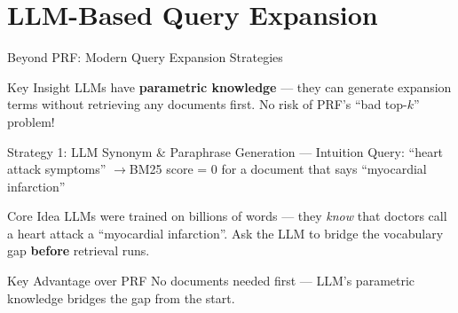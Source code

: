 \documentclass[aspectratio=169]{beamer}
\newif\ifanimated
\newcommand{\cpause}{\ifanimated\pause\fi}
\begin{document}
\section{LLM-Based Query Expansion}

\begin{frame}{Beyond PRF: Modern Query Expansion Strategies}
\begin{center}

\end{center}

\vspace{1em}

\begin{block}{Key Insight}
LLMs have \textbf{parametric knowledge} --- they can generate expansion terms without retrieving any documents first. No risk of PRF's ``bad top-$k$'' problem!
\end{block}
\end{frame}

\begin{frame}{Strategy 1: LLM Synonym \& Paraphrase Generation --- Intuition}
Query: ``heart attack symptoms'' \quad$\longrightarrow$\quad BM25 score = 0 for a document that says ``myocardial infarction''
\cpause

\begin{block}{Core Idea}
LLMs were trained on billions of words --- they \emph{know} that doctors call a heart attack a ``myocardial infarction''. Ask the LLM to bridge the vocabulary gap \textbf{before} retrieval runs.
\end{block}

\vspace{1em}

\begin{center}
\end{center}

\vspace{0.5em}

\begin{alertblock}{Key Advantage over PRF}
\footnotesize
No documents needed first --- LLM's parametric knowledge bridges the gap from the start.
\end{alertblock}

\end{frame}
\end{document}
